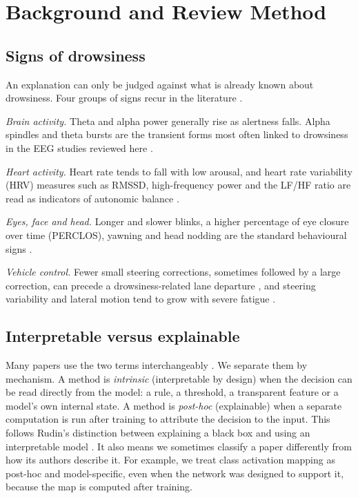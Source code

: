 \section{Background and Review Method}
\label{sec:background}

\subsection{Signs of drowsiness}
An explanation can only be judged against what is already known about drowsiness. Four groups of signs recur in the literature \cite{fu2024survey,ali2026intelligent}.

\textit{Brain activity.} Theta and alpha power generally rise as alertness falls. Alpha spindles and theta bursts are the transient forms most often linked to drowsiness in the EEG studies reviewed here \cite{cui2022eeg,cui2022compact,zhuang2024connectivity}.

\textit{Heart activity.} Heart rate tends to fall with low arousal, and heart rate variability (HRV) measures such as RMSSD, high-frequency power and the LF/HF ratio are read as indicators of autonomic balance \cite{puspasari2026predicting}.

\textit{Eyes, face and head.} Longer and slower blinks, a higher percentage of eye closure over time (PERCLOS), yawning and head nodding are the standard behavioural signs \cite{fu2024survey,hasan2024validation}.

\textit{Vehicle control.} Fewer small steering corrections, sometimes followed by a large correction, can precede a drowsiness-related lane departure \cite{mcdonald2014steering}, and steering variability and lateral motion tend to grow with severe fatigue \cite{zhu2025madfm}.

\subsection{Interpretable versus explainable}
Many papers use the two terms interchangeably \cite{xaieeg2026review}. We separate them by mechanism. A method is \textit{intrinsic} (interpretable by design) when the decision can be read directly from the model: a rule, a threshold, a transparent feature or a model's own internal state. A method is \textit{post-hoc} (explainable) when a separate computation is run after training to attribute the decision to the input. This follows Rudin's distinction between explaining a black box and using an interpretable model \cite{rudin2019stop}. It also means we sometimes classify a paper differently from how its authors describe it. For example, we treat class activation mapping as post-hoc and model-specific, even when the network was designed to support it, because the map is computed after training.

